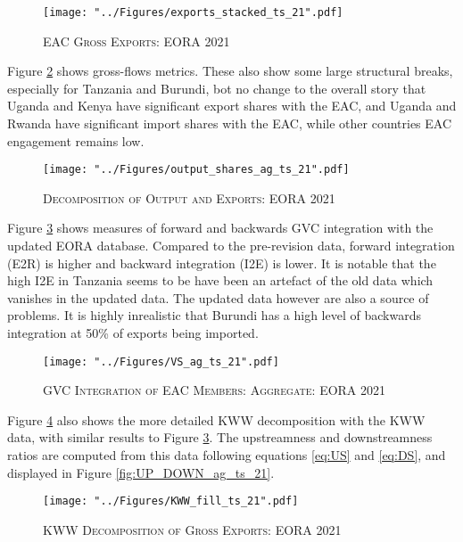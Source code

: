 \documentclass[a4paper]{article}
\begin{document}
\begin{figure}[h!]
\centering
\caption{\label{fig:exp21}\textsc{EAC Gross Exports: EORA 2021}}
\texttt{[image: "../Figures/exports\_stacked\_ts\_21".pdf]} %
\end{figure}
\FloatBarrier

Figure \ref{fig:outshares_ag_ts_21} shows gross-flows metrics. These also show some large structural breaks, especially for Tanzania and Burundi, bot no change to the overall story that Uganda and Kenya have significant export shares with the EAC, and Uganda and Rwanda have significant import shares with the EAC, while other countries EAC engagement remains low. 

\begin{figure}[h!]
\centering
\caption{\label{fig:outshares_ag_ts_21}\textsc{Decomposition of Output and Exports: EORA 2021}}
\texttt{[image: "../Figures/output\_shares\_ag\_ts\_21".pdf]} %
\end{figure}
\FloatBarrier

Figure \ref{fig:VSag_ts_21} shows measures of forward and backwards GVC integration with the updated EORA database. Compared to the pre-revision data, forward integration (E2R) is higher and backward integration (I2E) is lower. It is notable that the high I2E in Tanzania seems to be have been an artefact of the old data which vanishes in the updated data. The updated data however are also a source of problems. It is highly inrealistic that Burundi has a high level of backwards integration at 50\% of exports being imported. 

\begin{figure}[h!]
\centering
\caption{\label{fig:VSag_ts_21}\textsc{GVC Integration of EAC Members: Aggregate: EORA 2021}}
\texttt{[image: "../Figures/VS\_ag\_ts\_21".pdf]} %
\end{figure}
\FloatBarrier

Figure \ref{fig:KWW_fill_ts_21} also shows the more detailed KWW decomposition with the KWW data, with similar results to Figure \ref{fig:VSag_ts_21}. The upstreamness and downstreamness ratios are computed from this data following equations \ref{eq:US} and \ref{eq:DS}, and displayed in Figure \ref{fig:UP_DOWN_ag_ts_21}.


\begin{figure}[h!]
\centering
\caption{\label{fig:KWW_fill_ts_21}\textsc{KWW Decomposition of Gross Exports: EORA 2021}}
\texttt{[image: "../Figures/KWW\_fill\_ts\_21".pdf]} %
\end{figure}
\FloatBarrier
\end{document}
